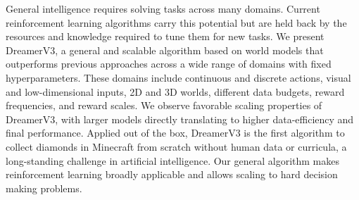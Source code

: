 General intelligence requires solving tasks across many domains. Current reinforcement learning algorithms carry this potential but are held back by the resources and knowledge required to tune them for new tasks. We present DreamerV3, a general and scalable algorithm based on world models that outperforms previous approaches across a wide range of domains with fixed hyperparameters. These domains include continuous and discrete actions, visual and low-dimensional inputs, 2D and 3D worlds, different data budgets, reward frequencies, and reward scales. We observe favorable scaling properties of DreamerV3, with larger models directly translating to higher data-efficiency and final performance. Applied out of the box, DreamerV3 is the first algorithm to collect diamonds in Minecraft from scratch without human data or curricula, a long-standing challenge in artificial intelligence. Our general algorithm makes reinforcement learning broadly applicable and allows scaling to hard decision making problems.